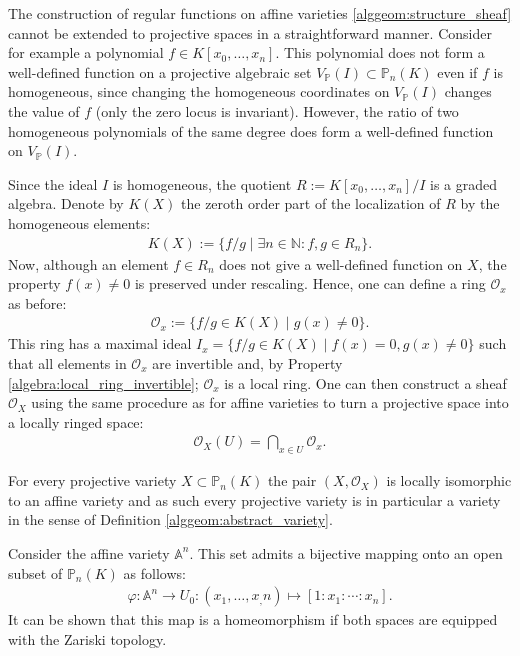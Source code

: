     The construction of regular functions on affine varieties \ref{alggeom:structure_sheaf} cannot be extended to projective spaces in a straightforward manner. Consider for example a polynomial $f\in K[x_0,\ldots,x_n]$. This polynomial does not form a well-defined function on a projective algebraic set $V_\mathbb{P}(I)\subset\mathbb{P}_n(K)$ even if $f$ is homogeneous, since changing the homogeneous coordinates on $V_\mathbb{P}(I)$ changes the value of $f$ (only the zero locus is invariant). However, the ratio of two homogeneous polynomials of the same degree does form a well-defined function on $V_\mathbb{P}(I)$.

    Since the ideal $I$ is homogeneous, the quotient $R:=K[x_0,\ldots,x_n]/I$ is a graded algebra. Denote by $K(X)$ the zeroth order part of the localization of $R$ by the homogeneous elements:
    \begin{gather}
        K(X) := \{f/g\mid\exists n\in\mathbb{N}:f,g\in R_n\}.
    \end{gather}
    Now, although an element $f\in R_n$ does not give a well-defined function on $X$, the property $f(x)\neq0$ is preserved under rescaling. Hence, one can define a ring $\mathcal{O}_x$ as before:
    \begin{gather}
        \mathcal{O}_x := \{f/g\in K(X)\mid g(x)\neq 0\}.
    \end{gather}
    This ring has a maximal ideal $I_x = \{f/g\in K(X)\mid f(x)=0,g(x)\neq 0\}$ such that all elements in $\mathcal{O}_x$ are invertible and, by Property \ref{algebra:local_ring_invertible}; $\mathcal{O}_x$ is a local ring. One can then construct a sheaf $\mathcal{O}_X$ using the same procedure as for affine varieties to turn a projective space into a locally ringed space:
    \begin{gather}
        \mathcal{O}_X(U) = \bigcap_{x\in U}\mathcal{O}_x.
    \end{gather}

    \begin{property}[Variety]
        For every projective variety $X\subset\mathbb{P}_n(K)$ the pair $(X, \mathcal{O}_X)$ is locally isomorphic to an affine variety and as such every projective variety is in particular a variety in the sense of Definition \ref{alggeom:abstract_variety}.
    \end{property}
    \begin{property}
        Consider the affine variety $\mathbb{A}^n$. This set admits a bijective mapping onto an open subset of $\mathbb{P}_n(K)$ as follows:
        \begin{gather}
            \varphi:\mathbb{A}^n\rightarrow U_0:(x_1,\ldots,x_,n)\mapsto[1:x_1:\cdots:x_n].
        \end{gather}
        It can be shown that this map is a homeomorphism if both spaces are equipped with the Zariski topology.
    \end{property}

